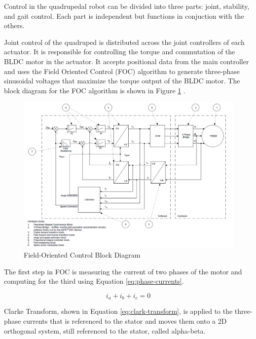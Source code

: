 \documentclass[english]{upeeei}
\begin{document}
Control in the quadrupedal robot can be divided into three parts: joint, stability, and gait control. Each part is independent but functions in conjuction with the others.

Joint control of the quadruped is distributed across the joint controllers of each actuator. It is responsible for controlling the torque and commutation of the BLDC motor in the actuator. It accepts positional data from the main controller and uses the Field Oriented Control (FOC) algorithm to generate three-phase sinusoidal voltages that maximize the torque output of the BLDC motor. The block diagram for the FOC algorithm is shown in Figure \ref{fig:foc-block-diagram} \cite{an1292}.

\begin{figure}[H]
\begin{centering}
\includegraphics[width=1.0\columnwidth]{images/foc}
\par\end{centering}
\caption{Field-Oriented Control Block Diagram\label{fig:foc-block-diagram}}
\end{figure}

The first step in FOC is measuring the current of two phases of the motor and computing for the third using Equation \ref{eq:phase-currents}. 

\begin{equation} \label{eq:phase-currents}
    i_a + i_b + i_c = 0
\end{equation}

Clarke Transform, shown in Equation \ref{eq:clark-transform}, is applied to the three-phase currents that is referenced to the stator and moves them onto a 2D orthogonal system, still referenced to the stator, called alpha-beta.
\end{document}
